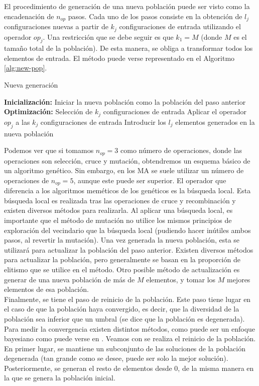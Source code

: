 El procedimiento de generación de una nueva población puede ser visto como la encadenación de $n_{op}$ pasos. Cada uno de los pasos consiste en la obtención de $l_j$ configuraciones nuevas a partir de $k_j$ configuraciones de entrada utilizando el operador $op_j$. Una restricción que se debe seguir es que $k_1=M$ (donde $M$ es el tamaño total de la población). De esta manera, se obliga a transformar todos los elementos de entrada. El método puede verse representado en el Algoritmo \ref{alg:new-pop}.\\
\begin{algorithm}[!b]
    \caption{Nueva generación}
    \label{alg:new-pop}
    \begin{algorithmic}[1]
        \State \textbf{Inicialización:}
        \State Iniciar la nueva población como la población del paso anterior
        \State \textbf{Optimización:}
            \State Selección de $k_j$ configuraciones de entrada
            \State Aplicar el operador $op_j$ a las $k_j$ configuraciones de entrada
            \State Introducir los $l_j$ elementos generados en la nueva población
        \EndFor
    \end{algorithmic}
\end{algorithm}

Podemos ver que si tomamos $n_{op}=3$ como número de operaciones, donde las operaciones son selección, cruce y mutación, obtendremos un esquema básico de un algoritmo genético. Sin embargo, en los MA se suele utilizar un número de operaciones de $n_{op}=5$, aunque este puede ser superior. El operador que diferencia a los algoritmos meméticos de los genéticos es la búsqueda local. Esta búsqueda local es realizada tras las operaciones de cruce y recombinación y existen diversos métodos para realizarla. Al aplicar una búsqueda local, es importante que el método de mutación no utilice los mismos principios de exploración del vecindario que la búsqueda local (pudiendo hacer inútiles ambos pasos, al revertir la mutación). Una vez generada la nueva población, esta se utilizará para actualizar la población del paso anterior. Existen diversos métodos para actualizar la población, pero generalmente se basan en la proporción de elitismo que se utilice en el método. Otro posible método de actualización es generar de una nueva población de más de $M$ elementos, y tomar los $M$ mejores elementos de esa población.\\

Finalmente, se tiene el paso de reinicio de la población. Este paso tiene lugar en el caso de que la población haya convergido, es decir, que la diversidad de la población sea inferior que un umbral (se dice que la población es degenerada). Para medir la convergencia existen distintos métodos, como puede ser un enfoque bayesiano como puede verse en \cite{Hulin1997AnOS}. Veamos con se realiza el reinicio de la población. En primer lugar, se mantiene un subconjunto de las soluciones de la población degenerada (tan grande como se desee, puede ser solo la mejor solución). Posteriormente, se generan el resto de elementos desde 0, de la misma manera en la que se genera la población inicial.\\

